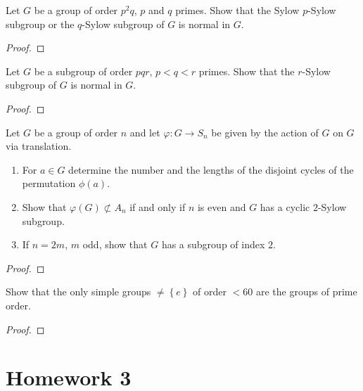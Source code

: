 \begin{exercise}
Let $G$ be a group of order $p^2q$, $p$ and $q$ primes. Show that the Sylow
$p$-Sylow subgroup or the $q$-Sylow subgroup of $G$ is normal in $G$.
\end{exercise}
\begin{proof}
\end{proof}

\begin{exercise}
Let $G$ be a subgroup of order $pqr$, $p<q<r$ primes. Show that the
$r$-Sylow subgroup of $G$ is normal in $G$.
\end{exercise}
\begin{proof}
\end{proof}

\begin{exercise}
Let $G$ be a group of order $n$ and let $\varphi\colon G\to S_n$ be given by
the action of $G$ on $G$ via translation.
\begin{enumerate}[label=(\alph*)]
\item For $a\in G$ determine the number and the lengths of the disjoint
  cycles of the permutation $\phi(a)$.
\item Show that $\varphi(G)\nsubset A_n$ if and only if $n$ is even and $G$
  has a cyclic $2$-Sylow subgroup.
\item If $n=2m$, $m$ odd, show that $G$ has a subgroup of index $2$.
\end{enumerate}
\end{exercise}
\begin{proof}
\end{proof}

\begin{exercise}
Show that the only simple groups $\neq\left\{e\right\}$ of order $<60$ are
the groups of prime order.
\end{exercise}
\begin{proof}
\end{proof}

\section{Homework 3}

